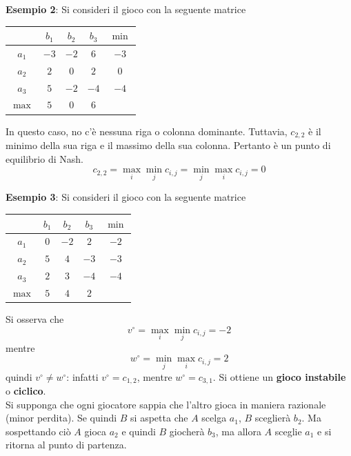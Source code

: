 \documentclass[a4paper]{extarticle}
\renewcommand\arraystretch{}
\begin{document}
\vspace{1em}
\noindent
\textbf{Esempio 2}: Si consideri il gioco con la seguente matrice

\vspace{1em}
\noindent
\begin{table}[H]
    \setlength{\tabcolsep}{8pt}
    \renewcommand{\arraystretch}{1.5}
    \noindent
    \centering
    \begin{tabular}{|c|ccc|c}
        \hline
         & $b_1$ & $b_2$ & $b_3$ & ${\min}$\\
        \hline
        $a_1$ & $-3$ & $-2$ & $6$ & $-3$\\
        $a_2$ & $2$ & $0$ & $2$   & $0$\\
        $a_3$ & $5$ & $-2$ & $-4$ & $-4$\\
        \hline
        ${\max}$ & $5$ & $0$ & $6$
    \end{tabular}
\end{table}

\vspace{1em}
\noindent
In questo caso, no c'è nessuna riga o colonna dominante. Tuttavia, $c_{2,2}$ è il minimo della sua riga e il massimo della sua colonna. Pertanto è un punto di equilibrio di Nash.
\[c_{2,2} = \underset{i}{\max} \underset{j}{\min} c_{i,j} = \underset{j}{\min} \underset{i}{\max} c_{i,j} = 0\]

\vspace{1em}
\noindent
\textbf{Esempio 3}: Si consideri il gioco con la seguente matrice

\vspace{1em}
\noindent
\begin{table}[H]
    \setlength{\tabcolsep}{8pt}
    \renewcommand{\arraystretch}{1.5}
    \noindent
    \centering
    \begin{tabular}{|c|ccc|c}
        \hline
         & $b_1$ & $b_2$ & $b_3$ & ${\min}$\\
        \hline
        $a_1$ & $0$ & $-2$ & $2$ & $-2$\\
        $a_2$ & $5$ & $4$ & $-3$ & $-3$\\
        $a_3$ & $2$ & $3$ & $-4$ & $-4$\\
        \hline
        ${\max}$ & $5$ & $4$ & $2$
    \end{tabular}
\end{table}

\vspace{1em}
\noindent
Si osserva che 
\[v^\circ = \underset{i}{\max} \underset{j}{\min} c_{i,j} = -2\]
mentre
\[w^\circ = \underset{j}{\min} \underset{i}{\max} c_{i,j} = 2\]
quindi $v^\circ \neq w^\circ$: infatti $v^\circ=c_{1,2}$, mentre $w^\circ=c_{3,1}$. Si ottiene un \textbf{gioco instabile} o \textbf{ciclico}.\\
Si supponga che ogni giocatore sappia che l'altro gioca in maniera razionale (minor perdita). Se quindi $B$ si aspetta che $A$ scelga $a_1$, $B$ sceglierà $b_2$. Ma sospettando ciò $A$ gioca $a_2$ e quindi $B$ giocherà $b_3$, ma allora $A$ sceglie $a_1$ e si ritorna al punto di partenza.
\end{document}
